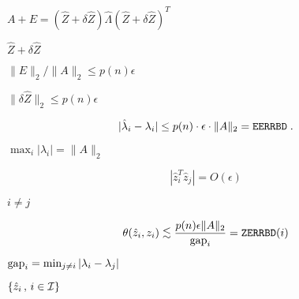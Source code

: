 {\newpage\clearpage
{}%
$A+E = (\hat{Z}+ \delta \hat{Z}) \hat{\Lambda} (\hat{Z}+ \delta \hat{Z})^T$%
\lthtmlinlinemathZ
\lthtmlcheckvsize\clearpage}

{\newpage\clearpage
{}%
$\hat{Z}+ \delta \hat{Z}$%
\lthtmlinlinemathZ
\lthtmlcheckvsize\clearpage}

{\newpage\clearpage
{}%
$\|E\|_2 / \|A\|_2 \leq p(n) \epsilon$%
\lthtmlinlinemathZ
\lthtmlcheckvsize\clearpage}

{\newpage\clearpage
{}%
$\| \delta \hat{Z} \|_2 \leq p(n) \epsilon$%
\lthtmlinlinemathZ
\lthtmlcheckvsize\clearpage}

{\newpage\clearpage
{}%
\begin{displaymath}
| \hat{\lambda}_i - \lambda_i |  \leq p(n) \cdot \epsilon \cdot \|A\|_2
= {\tt EERRBD} \; .
\end{displaymath}%
\lthtmldisplayZ
\lthtmlcheckvsize\clearpage}

{\newpage\clearpage
{}%
$\max_i | \lambda_i | = \|A\|_2$%
\lthtmlinlinemathZ
\lthtmlcheckvsize\clearpage}

{\newpage\clearpage
{}%
\begin{displaymath}
|\hat{z}_i^T \hat{z}_j | = O( \epsilon )
\end{displaymath}%
\lthtmldisplayZ
\lthtmlcheckvsize\clearpage}

{\newpage\clearpage
{}%
$i \neq j$%
\lthtmlinlinemathZ
\lthtmlcheckvsize\clearpage}

{\newpage\clearpage
{}%
\begin{displaymath}
\theta ( \hat{z}_i , z_i ) \mathrel{\raisebox{-.75ex}{$\mathop{\sim}\limits^{\textstyle <}$}}\frac{p(n) \epsilon \|A\|_2}{{\rm gap}_i}
= {\tt ZERRBD}(i)
\end{displaymath}%
\lthtmldisplayZ
\lthtmlcheckvsize\clearpage}

{\newpage\clearpage
{}%
${\rm gap}_i = \min_{j \neq i} | \lambda_i - \lambda_j |$%
\lthtmlinlinemathZ
\lthtmlcheckvsize\clearpage}

{\newpage\clearpage
{}%
$\{\hat{z}_i \, , \, i \in {\cal I}\}$%
\lthtmlinlinemathZ
\lthtmlcheckvsize\clearpage}

